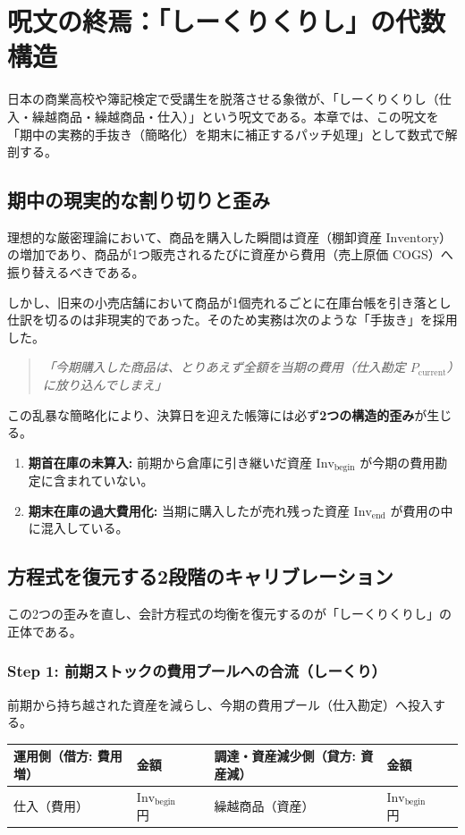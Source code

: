 \ifja
\chapter{呪文の終焉：「しーくりくりし」の代数構造}
\label{chap:cost_of_goods_sold}

日本の商業高校や簿記検定で受講生を脱落させる象徴が、「しーくりくりし（仕入・繰越商品・繰越商品・仕入）」という呪文である。本章では、この呪文を「期中の実務的手抜き（簡略化）を期末に補正するパッチ処理」として数式で解剖する。

\section{期中の現実的な割り切りと歪み}
理想的な厳密理論において、商品を購入した瞬間は資産（棚卸資産 $\text{Inventory}$）の増加であり、商品が1つ販売されるたびに資産から費用（売上原価 $\text{COGS}$）へ振り替えるべきである。



しかし、旧来の小売店舗において商品が1個売れるごとに在庫台帳を引き落とし仕訳を切るのは非現実的であった。そのため実務は次のような「手抜き」を採用した。
\begin{quote}
\textit{「今期購入した商品は、とりあえず全額を当期の費用（仕入勘定 $P_{\text{current}}$）に放り込んでしまえ」}
\end{quote}

この乱暴な簡略化により、決算日を迎えた帳簿には必ず\textbf{2つの構造的歪み}が生じる。
\begin{enumerate}
    \item \textbf{期首在庫の未算入:} 前期から倉庫に引き継いだ資産 $\text{Inv}_{\text{begin}}$ が今期の費用勘定に含まれていない。
    \item \textbf{期末在庫の過大費用化:} 当期に購入したが売れ残った資産 $\text{Inv}_{\text{end}}$ が費用の中に混入している。
\end{enumerate}

\section{方程式を復元する2段階のキャリブレーション}
この2つの歪みを直し、会計方程式の均衡を復元するのが「しーくりくりし」の正体である。

\subsection{Step 1: 前期ストックの費用プールへの合流（しーくり）}
前期から持ち越された資産を減らし、今期の費用プール（仕入勘定）へ投入する。
\begin{table}[htbp]
\centering
\begin{tabular}{llrllr}
\toprule
\textbf{運用側（借方: 費用増）} & 金額 & \quad & \textbf{調達・資産減少側（貸方: 資産減）} & 金額 \\
\midrule
仕入（費用） & $\text{Inv}_{\text{begin}}$ 円 & & 繰越商品（資産） & $\text{Inv}_{\text{begin}}$ 円 \\
\bottomrule
\end{tabular}
\end{table}

